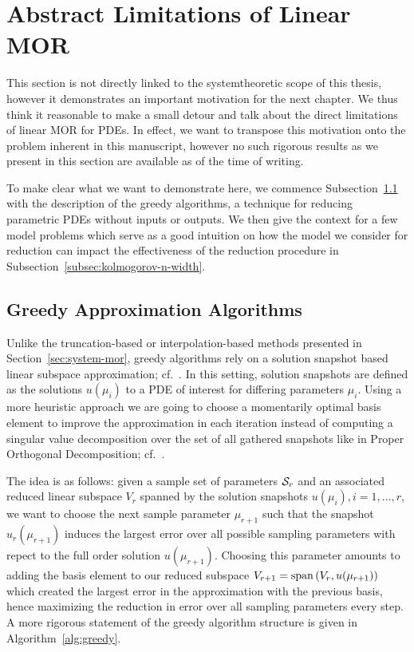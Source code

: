 \section{Abstract Limitations of Linear MOR}\label{sec:limitations-linear-mor}

This section is not directly linked to the systemtheoretic scope of this thesis, however it demonstrates an important motivation for the next chapter.
We thus think it reasonable to make a small detour and talk about the direct limitations of linear MOR for \acp{PDE}.
In effect, we want to transpose this motivation onto the problem inherent in this manuscript, however no such rigorous results as we present in this section are available as of the time of writing.

To make clear what we want to demonstrate here, we commence Subsection~\ref{subsec:greedy-algorithms} with the description of the greedy algorithms, a technique for reducing parametric \acp{PDE} without inputs or outputs.
We then give the context for a few model problems which serve as a good intuition on how the model we consider for reduction can impact the effectiveness of the reduction procedure in Subsection~\ref{subsec:kolmogorov-n-width}.

\subsection{Greedy Approximation Algorithms}\label{subsec:greedy-algorithms}

Unlike the truncation-based or interpolation-based methods presented in Section~\ref{sec:system-mor}, greedy algorithms rely on a solution snapshot based linear subspace approximation; cf.~\cite{Grepl2005, Rozza2008, Buffa2012}.
In this setting, solution snapshots are defined as the solutions $u(\mu_i)$ to a \ac{PDE} of interest for differing parameters $\mu_i$.
Using a more heuristic approach we are going to choose a momentarily optimal basis element to improve the approximation in each iteration instead of computing a singular value decomposition over the set of all gathered snapshots like in Proper Orthogonal Decomposition; cf.~\cite{Pinkus1985, Pinnau2008}.

The idea is as follows: given a sample set of parameters $\mathcal{S}_r$ and an associated reduced linear subspace $V_r$ spanned by the solution snapshots $u(\mu_i), i = 1, \dots, r$, we want to choose the next sample parameter $\mu_{r + 1}$ such that the snapshot $u_r(\mu_{r + 1})$ induces the largest error over all possible sampling parameters with repect to the full order solution $u(\mu_{r + 1})$.
Choosing this parameter amounts to adding the basis element to our reduced subspace $V_{r + 1} = \mathop{}\!\mathrm{span}\left(V_r, u(\mu_{r + 1})\right)$ which created the largest error in the approximation with the previous basis, hence maximizing the reduction in error over all sampling parameters every step.
A more rigorous statement of the greedy algorithm structure is given in Algorithm~\ref{alg:greedy}.

